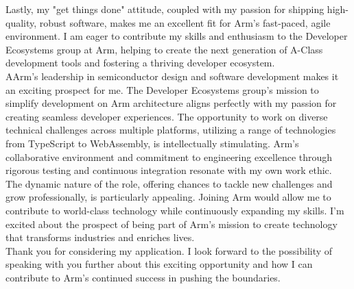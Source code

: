 \documentclass[11pt,a4paper,ragged2e]{altacv}
\begin{document}
\begin{paracol}{1}
\medskip
Lastly, my "get things done" attitude, coupled with my passion for shipping high-quality, robust software, makes me an excellent fit for Arm's fast-paced, agile environment. I am eager to contribute my skills and enthusiasm to the Developer Ecosystems group at Arm, helping to create the next generation of A-Class development tools and fostering a thriving developer ecosystem. \\
AArm's leadership in semiconductor design and software development makes it an exciting prospect for me. The Developer Ecosystems group's mission to simplify development on Arm architecture aligns perfectly with my passion for creating seamless developer experiences. The opportunity to work on diverse technical challenges across multiple platforms, utilizing a range of technologies from TypeScript to WebAssembly, is intellectually stimulating. Arm's collaborative environment and commitment to engineering excellence through rigorous testing and continuous integration resonate with my own work ethic. The dynamic nature of the role, offering chances to tackle new challenges and grow professionally, is particularly appealing. Joining Arm would allow me to contribute to world-class technology while continuously expanding my skills. I'm excited about the prospect of being part of Arm's mission to create technology that transforms industries and enriches lives. \\
Thank you for considering my application. I look forward to the possibility of speaking with you further about this exciting opportunity and how I can contribute to Arm's continued success in pushing the boundaries.




\end{paracol}
\end{document}

